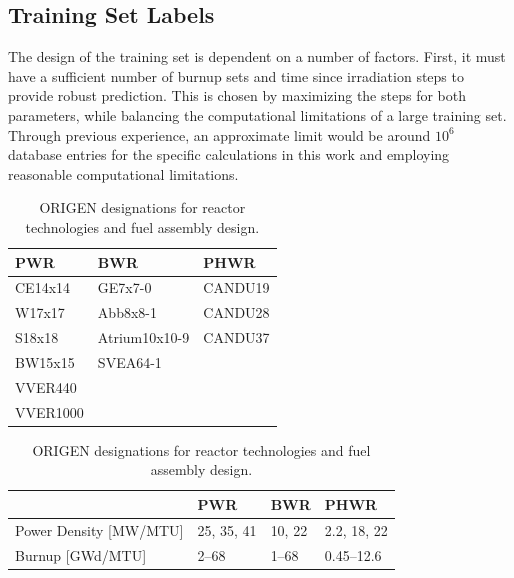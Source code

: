 \subsection{Training Set Labels}
\label{sec:snflbls}

The design of the training set is dependent on a number of factors.  First, it
must have a sufficient number of burnup sets and time since irradiation steps
to provide robust prediction. This is chosen by maximizing the steps for both
parameters, while balancing the computational limitations of a large training
set. Through previous experience, an approximate limit would be around $10^6$
database entries for the specific calculations in this work and employing
reasonable computational limitations.

\begin{table}[!htb]
  \centering
  \begin{subtable}{\linewidth}
    \centering
    \begin{tabular}{@{}lll@{}}
    \toprule
      \textbf{PWR} & \textbf{BWR}  & \textbf{PHWR} \\ \toprule
      CE14x14      & GE7x7-0       & CANDU19       \\
      W17x17       & Abb8x8-1      & CANDU28       \\
      S18x18       & Atrium10x10-9 & CANDU37       \\
      BW15x15      & SVEA64-1      &               \\
      VVER440      &               &               \\
      VVER1000     &               &               \\ \bottomrule
    \end{tabular}
    \caption{\acrshort{ORIGEN} designations for reactor technologies and fuel assembly design.}
    \label{tbl:rxtrtype}
    \vspace*{5mm}
  \end{subtable}
  \begin{subtable}{\linewidth}
    \centering
    \begin{tabular}{@{}llll@{}}
      \toprule
                                & \textbf{PWR}              & \textbf{BWR}              & \textbf{PHWR} \\ \toprule
      Power Density [MW/MTU]    & 25, 35, 41                & 10, 22                    & 2.2, 18, 22   \\
      Burnup [GWd/MTU]          & 2--68                     & 1--68                     & 0.45--12.6    \\

\end{tabular}
\end{subtable}
\end{table}
